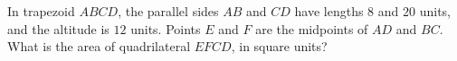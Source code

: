 In trapezoid $ABCD$, the parallel sides $AB$ and $CD$ have lengths $8$ and $20$ units, and the altitude is $12$ units. Points $E$ and $F$ are the midpoints of $AD$ and $BC$. What is the area of quadrilateral $EFCD$, in square units?
